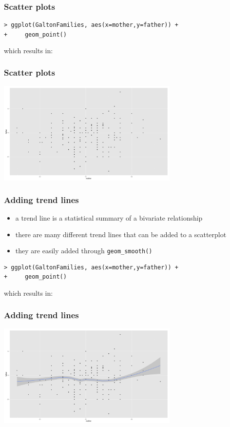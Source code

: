 \documentclass[xcolor={table}]{beamer}
\begin{document}
\begin{frame}[fragile]\frametitle{Scatter plots}
\small
\begin{verbatim}
> ggplot(GaltonFamilies, aes(x=mother,y=father)) +
+     geom_point()
\end{verbatim}
which results in:
\end{frame}


\begin{frame}\frametitle{Scatter plots}
  \begin{center}
    \includegraphics[width=9cm]{scatter.png}
  \end{center}
\end{frame}

\begin{frame}[fragile]\frametitle{Adding trend lines}
  \begin{itemize}
  \item a trend line is a statistical summary of a bivariate relationship
  \item there are many different trend lines that can be added to a scatterplot
  \item they are easily added through \texttt{geom\_smooth()}
  \end{itemize}\small
\begin{verbatim}
> ggplot(GaltonFamilies, aes(x=mother,y=father)) +
+     geom_point()
\end{verbatim}
which results in:
\end{frame}


\begin{frame}\frametitle{Adding trend lines}
  \begin{center}
    \includegraphics[width=9cm]{scattertrend1.png}
  \end{center}
\end{frame}
\end{document}
